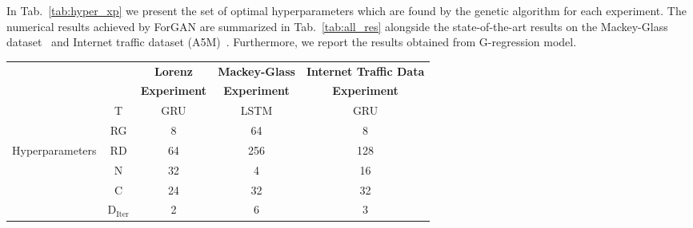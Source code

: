 \documentclass{ieeeaccess}
\begin{document}
In Tab.~\ref{tab:hyper_xp} we present the set of optimal hyperparameters which are found by the genetic algorithm for each experiment. The numerical results achieved by ForGAN are summarized in Tab.~\ref{tab:all_res} alongside the state-of-the-art results on the Mackey-Glass dataset~\cite{mendez2017competitive} and Internet traffic dataset (A5M)~\cite{cortez2012multi}. Furthermore, we report the results obtained from G-regression model.
\begin{table*}
	\centering
	\caption{The optimal hyperparameters used to construct ForGAN for different experiments.}
	\begin{tabular}{c|cccc}
		\toprule
		\multicolumn{2}{c}{ } & \textbf{Lorenz} & \textbf{Mackey-Glass} & \textbf{Internet Traffic Data} \\
		\multicolumn{2}{c}{ } & \textbf{Experiment} & \textbf{Experiment} & \textbf{Experiment} \\
		\midrule
		& T  & GRU & LSTM & GRU \\
		&RG & 8 & 64 & 8 \\
		Hyperparameters  &RD & 64 & 256 & 128 \\
		& N & 32 & 4 & 16 \\
		& C & 24 & 32 & 32 \\
		& $\text{D}_\text{Iter}$ & 2 & 6 & 3 \\
		\bottomrule
	\end{tabular}

	\label{tab:hyper_xp}
\end{table*}
\end{document}
